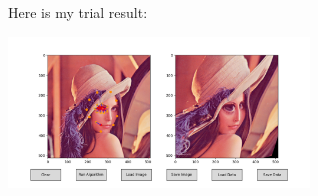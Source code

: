 \documentclass[11pt,letter,notitlepage]{article}
\begin{document}
\begin{solution}
\begin{enumerate}
	Here is my trial result:
	\begin{center}
    	\includegraphics[width=0.6\textwidth]{./Figure/All.png}
    	\label{fig:image-warping-results}
	\end{center}
\end{enumerate}
\end{solution}
    
\newpage
\end{document}
